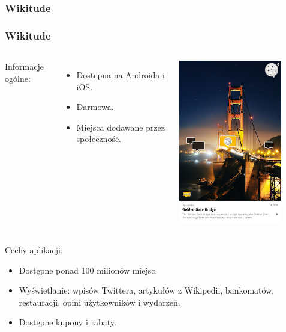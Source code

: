 \subsubsection{Wikitude}
\begin{frame}[allowframebreaks]
\frametitle{Wikitude}

\begin{columns}
Informacje ogólne: 
\begin{itemize}
\item Dostepna na Androida i iOS.
\item Darmowa.
\item Miejsca dodawane przez społeczność.
\end{itemize}
\includegraphics[width=0.8\textwidth]{wikitude}
\end{columns}

\framebreak

Cechy aplikacji:
\begin{itemize}
\item Dostępne ponad 100 milionów miejsc.
\item Wyświetlanie: wpisów Twittera, artykułów z Wikipedii, bankomatów,
    restauracji, opini użytkowników i wydarzeń.
\item Dostępne kupony i rabaty.
\end{itemize}

\end{frame}
